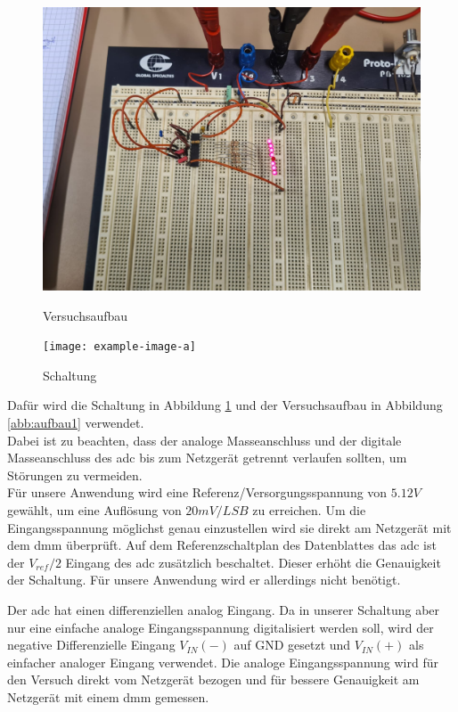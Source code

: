 \documentclass[12pt, a4paper, ngerman]{article}
\begin{document}
\begin{figure}%
  \centering
  \begin{minipage}[b]{0.49\textwidth}
    \includegraphics[width=\textwidth]{versuch_1_versuchsaufbau.jpeg}
    \caption{Versuchsaufbau}
    \label{abb:aufbau1}
  \end{minipage}
  \hfill
  \begin{minipage}[b]{0.49\textwidth}
    \texttt{[image: example-image-a]}
    \caption{Schaltung}
    \label{abb:schaltung1}
  \end{minipage}
\end{figure}

Dafür wird die Schaltung in Abbildung \ref{abb:schaltung1}
und der Versuchsaufbau in Abbildung \ref{abb:aufbau1} verwendet. \\
Dabei ist zu beachten, dass der analoge Masseanschluss und der digitale Masseanschluss des \ac{adc}
bis zum Netzgerät getrennt verlaufen sollten, um Störungen zu vermeiden. \\
Für unsere Anwendung wird eine Referenz/Versorgungsspannung von $5.12V$ gewählt, um eine Auflösung von $20mV/LSB$ zu erreichen.
Um die Eingangsspannung möglichst genau einzustellen wird sie direkt am Netzgerät mit dem \ac{dmm} überprüft.
Auf dem Referenzschaltplan des Datenblattes das \ac{adc} ist der $V_{ref}/2$ Eingang
des \ac{adc} zusätzlich beschaltet. Dieser erhöht die Genauigkeit der Schaltung. %
Für unsere Anwendung wird er allerdings nicht benötigt.

Der \ac{adc} hat einen differenziellen analog Eingang.
Da in unserer Schaltung aber nur eine einfache analoge Eingangsspannung digitalisiert werden soll,
wird der negative Differenzielle Eingang $V_{IN}(-)$ auf GND gesetzt und $V_{IN}(+)$ als einfacher analoger Eingang verwendet.
Die analoge Eingangsspannung wird für den Versuch direkt vom Netzgerät bezogen
und für bessere Genauigkeit am Netzgerät mit einem \ac{dmm} gemessen.
\end{document}
